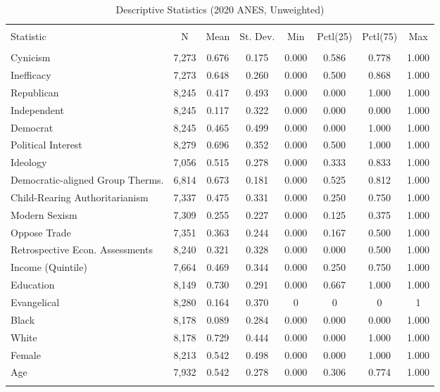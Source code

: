 \begin{table}[!h] \centering 
  \caption{Descriptive Statistics (2020 ANES, Unweighted)} 
  \label{tab:desc-2020} 
\begin{adjustbox}{width=\linewidth,center}
\begin{tabular}{@{\extracolsep{5pt}}lccccccc} 
\\[-1.8ex]\hline
\hline \\[-1.8ex] 
Statistic & \multicolumn{1}{c}{N} & \multicolumn{1}{c}{Mean} & \multicolumn{1}{c}{St. Dev.} & \multicolumn{1}{c}{Min} & \multicolumn{1}{c}{Pctl(25)} & \multicolumn{1}{c}{Pctl(75)} & \multicolumn{1}{c}{Max} \\ 
\hline \\[-1.8ex] 
Cynicism & 7,273 & 0.676 & 0.175 & 0.000 & 0.586 & 0.778 & 1.000 \\ 
Inefficacy & 7,273 & 0.648 & 0.260 & 0.000 & 0.500 & 0.868 & 1.000 \\ 
Republican & 8,245 & 0.417 & 0.493 & 0.000 & 0.000 & 1.000 & 1.000 \\ 
Independent & 8,245 & 0.117 & 0.322 & 0.000 & 0.000 & 0.000 & 1.000 \\ 
Democrat & 8,245 & 0.465 & 0.499 & 0.000 & 0.000 & 1.000 & 1.000 \\ 
Political Interest & 8,279 & 0.696 & 0.352 & 0.000 & 0.500 & 1.000 & 1.000 \\ 
Ideology & 7,056 & 0.515 & 0.278 & 0.000 & 0.333 & 0.833 & 1.000 \\ 
Democratic-aligned Group Therms. & 6,814 & 0.673 & 0.181 & 0.000 & 0.525 & 0.812 & 1.000 \\ 
Child-Rearing Authoritarianism & 7,337 & 0.475 & 0.331 & 0.000 & 0.250 & 0.750 & 1.000 \\ 
Modern Sexism & 7,309 & 0.255 & 0.227 & 0.000 & 0.125 & 0.375 & 1.000 \\ 
Oppose Trade & 7,351 & 0.363 & 0.244 & 0.000 & 0.167 & 0.500 & 1.000 \\ 
Retrospective Econ. Assessments & 8,240 & 0.321 & 0.328 & 0.000 & 0.000 & 0.500 & 1.000 \\ 
Income (Quintile) & 7,664 & 0.469 & 0.344 & 0.000 & 0.250 & 0.750 & 1.000 \\ 
Education & 8,149 & 0.730 & 0.291 & 0.000 & 0.667 & 1.000 & 1.000 \\ 
Evangelical & 8,280 & 0.164 & 0.370 & 0 & 0 & 0 & 1 \\ 
Black & 8,178 & 0.089 & 0.284 & 0.000 & 0.000 & 0.000 & 1.000 \\ 
White & 8,178 & 0.729 & 0.444 & 0.000 & 0.000 & 1.000 & 1.000 \\ 
Female & 8,213 & 0.542 & 0.498 & 0.000 & 0.000 & 1.000 & 1.000 \\ 
Age & 7,932 & 0.542 & 0.278 & 0.000 & 0.306 & 0.774 & 1.000 \\ 
\hline \\[-1.8ex] 
\end{tabular} 
\end{adjustbox}
\end{table} 

